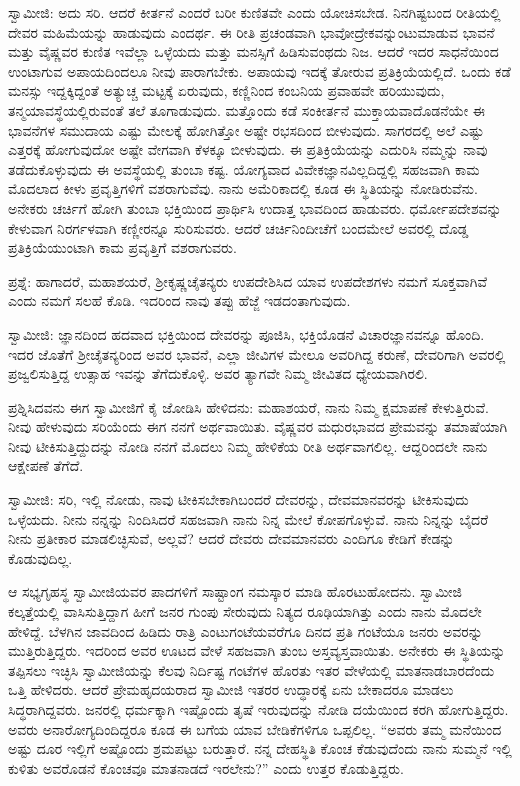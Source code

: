 ಸ್ವಾಮೀಜಿ: ಅದು ಸರಿ. ಆದರೆ ಕೀರ್ತನೆ ಎಂದರೆ ಬರೀ ಕುಣಿತವೇ ಎಂದು ಯೋಚಿಸಬೇಡ. ನಿನಗಿಷ್ಟಬಂದ ರೀತಿಯಲ್ಲಿ ದೇವರ ಮಹಿಮೆಯನ್ನು ಹಾಡುವುದು ಎಂದರ್ಥ. ಈ ರೀತಿ ಪ್ರಚಂಡವಾಗಿ ಭಾವೋದ್ರೇಕವನ್ನುಂಟುಮಾಡುವ ಭಾವನೆ ಮತ್ತು ವೈಷ್ಣವರ ಕುಣಿತ ಇವೆಲ್ಲಾ ಒಳ್ಳೆಯದು ಮತ್ತು ಮನಸ್ಸಿಗೆ ಹಿಡಿಸುವಂಥದು ನಿಜ. ಆದರೆ ಇದರ ಸಾಧನೆಯಿಂದ ಉಂಟಾಗುವ ಅಪಾಯದಿಂದಲೂ ನೀವು ಪಾರಾಗಬೇಕು. ಅಪಾಯವು ಇದಕ್ಕೆ ತೋರುವ ಪ್ರತಿಕ್ರಿಯೆಯಲ್ಲಿದೆ. ಒಂದು ಕಡೆ ಮನಸ್ಸು ಇದ್ದಕ್ಕಿದ್ದಂತೆ ಅತ್ಯುಚ್ಚ ಮಟ್ಟಕ್ಕೆ ಏರುವುದು, ಕಣ್ಣಿನಿಂದ ಕಂಬನಿಯ ಪ್ರವಾಹವೇ ಹರಿಯುವುದು, ತನ್ಮಯಾವಸ್ಥೆಯಲ್ಲಿರುವಂತೆ ತಲೆ ತೂಗಾಡುವುದು. ಮತ್ತೊಂದು ಕಡೆ ಸಂಕೀರ್ತನೆ ಮುಕ್ತಾಯವಾದೊಡನೆಯೇ ಈ ಭಾವನೆಗಳ ಸಮುದಾಯ ಎಷ್ಟು ಮೇಲಕ್ಕೆ ಹೋಗಿತ್ತೋ ಅಷ್ಟೇ ರಭಸದಿಂದ ಬೀಳುವುದು. ಸಾಗರದಲ್ಲಿ ಅಲೆ ಎಷ್ಟು ಎತ್ತರಕ್ಕೆ ಹೋಗುವುದೋ ಅಷ್ಟೇ ವೇಗವಾಗಿ ಕೆಳಕ್ಕೂ ಬೀಳುವುದು. ಈ ಪ್ರತಿಕ್ರಿಯೆಯನ್ನು ಎದುರಿಸಿ ನಮ್ಮನ್ನು ನಾವು ತಡೆದುಕೊಳ್ಳುವುದು ಈ ಅವಸ್ಥೆಯಲ್ಲಿ ತುಂಬಾ ಕಷ್ಟ. ಯೋಗ್ಯವಾದ ವಿವೇಕಜ್ಞಾನವಿಲ್ಲದಿದ್ದಲ್ಲಿ ಸಹಜವಾಗಿ ಕಾಮ ಮೊದಲಾದ ಕೀಳು ಪ್ರವೃತ್ತಿಗಳಿಗೆ ವಶರಾಗುವೆವು. ನಾನು ಅಮೆರಿಕಾದಲ್ಲಿ ಕೂಡ ಈ ಸ್ಥಿತಿಯನ್ನು ನೋಡಿರುವೆನು. ಅನೇಕರು ಚರ್ಚಿಗೆ ಹೋಗಿ ತುಂಬಾ ಭಕ್ತಿಯಿಂದ ಪ್ರಾರ್ಥಿಸಿ ಉದಾತ್ತ ಭಾವದಿಂದ ಹಾಡುವರು. ಧರ್ಮೋಪದೇಶವನ್ನು ಕೇಳುವಾಗ ನಿರರ್ಗಳವಾಗಿ ಕಣ್ಣೀರನ್ನೂ ಸುರಿಸುವರು. ಆದರೆ ಚರ್ಚಿನಿಂದೀಚೆಗೆ ಬಂದಮೇಲೆ ಅವರಲ್ಲಿ ದೊಡ್ಡ ಪ್ರತಿಕ್ರಿಯೆಯುಂಟಾಗಿ ಕಾಮ ಪ್ರವೃತ್ತಿಗೆ ವಶರಾಗುವರು.

ಪ್ರಶ್ನೆ: ಹಾಗಾದರೆ, ಮಹಾಶಯರೆ, ಶ‍್ರೀಕೃಷ್ಣಚೈತನ್ಯರು ಉಪದೇಶಿಸಿದ ಯಾವ ಉಪದೇಶಗಳು ನಮಗೆ ಸೂಕ್ತವಾಗಿವೆ ಎಂದು ನಮಗೆ ಸಲಹೆ ಕೊಡಿ. ಇದರಿಂದ ನಾವು ತಪ್ಪು ಹೆಜ್ಜೆ ಇಡದಂತಾಗುವುದು.

ಸ್ವಾಮೀಜಿ: ಜ್ಞಾನದಿಂದ ಹದವಾದ ಭಕ್ತಿಯಿಂದ ದೇವರನ್ನು ಪೂಜಿಸಿ, ಭಕ್ತಿಯೊಡನೆ ವಿಚಾರಜ್ಞಾನವನ್ನೂ ಹೊಂದಿ. ಇದರ ಜೊತೆಗೆ ಶ‍್ರೀಚೈತನ್ಯರಿಂದ ಅವರ ಭಾವನೆ, ಎಲ್ಲಾ ಜೀವಿಗಳ ಮೇಲೂ ಅವರಿಗಿದ್ದ ಕರುಣೆ, ದೇವರಿಗಾಗಿ ಅವರಲ್ಲಿ ಪ್ರಜ್ವಲಿಸುತ್ತಿದ್ದ ಉತ್ಸಾಹ ಇವನ್ನು ತೆಗೆದುಕೊಳ್ಳಿ. ಅವರ ತ್ಯಾಗವೇ ನಿಮ್ಮ ಜೀವಿತದ ಧ್ಯೇಯವಾಗಿರಲಿ.

ಪ್ರಶ್ನಿಸಿದವನು ಈಗ ಸ್ವಾಮೀಜಿಗೆ ಕೈ ಜೋಡಿಸಿ ಹೇಳಿದನು: ಮಹಾಶಯರೆ, ನಾನು ನಿಮ್ಮ ಕ್ಷಮಾಪಣೆ ಕೇಳುತ್ತಿರುವೆ. ನೀವು ಹೇಳುವುದು ಸರಿಯೆಂದು ಈಗ ನನಗೆ ಅರ್ಥವಾಯಿತು. ವೈಷ್ಣವರ ಮಧುರಭಾವದ ಪ್ರೇಮವನ್ನು ತಮಾಷೆಯಾಗಿ ನೀವು ಟೀಕಿಸುತ್ತಿದ್ದುದನ್ನು ನೋಡಿ ನನಗೆ ಮೊದಲು ನಿಮ್ಮ ಹೇಳಿಕೆಯ ರೀತಿ ಅರ್ಥವಾಗಲಿಲ್ಲ. ಆದ್ದರಿಂದಲೇ ನಾನು ಆಕ್ಷೇಪಣೆ ತೆಗೆದೆ.

ಸ್ವಾಮೀಜಿ: ಸರಿ, ಇಲ್ಲಿ ನೋಡು, ನಾವು ಟೀಕಿಸಬೇಕಾಗಿಬಂದರೆ ದೇವರನ್ನು, ದೇವಮಾನವರನ್ನು ಟೀಕಿಸುವುದು ಒಳ್ಳೆಯದು. ನೀನು ನನ್ನನ್ನು ನಿಂದಿಸಿದರೆ ಸಹಜವಾಗಿ ನಾನು ನಿನ್ನ ಮೇಲೆ ಕೋಪಗೊಳ್ಳುವೆ. ನಾನು ನಿನ್ನನ್ನು ಬೈದರೆ ನೀನು ಪ್ರತೀಕಾರ ಮಾಡಲಿಚ್ಛಿಸುವೆ, ಅಲ್ಲವೆ? ಆದರೆ ದೇವರು ದೇವಮಾನವರು ಎಂದಿಗೂ ಕೇಡಿಗೆ ಕೇಡನ್ನು ಕೊಡುವುದಿಲ್ಲ.

ಆ ಸಭ್ಯಗೃಹಸ್ಥ ಸ್ವಾಮೀಜಿಯವರ ಪಾದಗಳಿಗೆ ಸಾಷ್ಟಾಂಗ ನಮಸ್ಕಾರ ಮಾಡಿ ಹೊರಟುಹೋದನು. ಸ್ವಾಮೀಜಿ ಕಲ್ಕತ್ತೆಯಲ್ಲಿ ವಾಸಿಸುತ್ತಿದ್ದಾಗ ಹೀಗೆ ಜನರ ಗುಂಪು ಸೇರುವುದು ನಿತ್ಯದ ರೂಢಿಯಾಗಿತ್ತು ಎಂದು ನಾನು ಮೊದಲೇ ಹೇಳಿದ್ದೆ. ಬೆಳಗಿನ ಜಾವದಿಂದ ಹಿಡಿದು ರಾತ್ರಿ ಎಂಟುಗಂಟೆಯವರೆಗೂ ದಿನದ ಪ್ರತಿ ಗಂಟೆಯೂ ಜನರು ಅವರನ್ನು ಮುತ್ತಿರುತ್ತಿದ್ದರು. ಇದರಿಂದ ಅವರ ಊಟದ ವೇಳೆ ಸಹಜವಾಗಿ ತುಂಬ ಅಸ್ತವ್ಯಸ್ತವಾಯಿತು. ಅನೇಕರು ಈ ಸ್ಥಿತಿಯನ್ನು ತಪ್ಪಿಸಲು ಇಚ್ಛಿಸಿ ಸ್ವಾಮೀಜಿಯನ್ನು ಕೆಲವು ನಿರ್ದಿಷ್ಟ ಗಂಟೆಗಳ ಹೊರತು ಇತರ ವೇಳೆಯಲ್ಲಿ ಮಾತನಾಡಬಾರದೆಂದು ಒತ್ತಿ ಹೇಳಿದರು. ಆದರೆ ಪ್ರೇಮಹೃದಯರಾದ ಸ್ವಾಮೀಜಿ ಇತರರ ಉದ್ಧಾರಕ್ಕೆ ಏನು ಬೇಕಾದರೂ ಮಾಡಲು ಸಿದ್ಧರಾಗಿದ್ದವರು. ಜನರಲ್ಲಿ ಧರ್ಮಕ್ಕಾಗಿ ಇಷ್ಟೊಂದು ತೃಷೆ ಇರುವುದನ್ನು ನೋಡಿ ದಯೆಯಿಂದ ಕರಗಿ ಹೋಗುತ್ತಿದ್ದರು. ಅವರು ಅನಾರೋಗ್ಯದಿಂದಿದ್ದರೂ ಕೂಡ ಈ ಬಗೆಯ ಯಾವ ಬೇಡಿಕೆಗಳಿಗೂ ಒಪ್ಪಲಿಲ್ಲ. “ಅವರು ತಮ್ಮ ಮನೆಯಿಂದ ಅಷ್ಟು ದೂರ ಇಲ್ಲಿಗೆ ಅಷ್ಟೊಂದು ಶ್ರಮಪಟ್ಟು ಬರುತ್ತಾರೆ. ನನ್ನ ದೇಹಸ್ಥಿತಿ ಕೊಂಚ ಕೆಡುವುದೆಂದು ನಾನು ಸುಮ್ಮನೆ ಇಲ್ಲಿ ಕುಳಿತು ಅವರೊಡನೆ ಕೊಂಚವೂ ಮಾತನಾಡದೆ ಇರಲೇನು?” ಎಂದು ಉತ್ತರ ಕೊಡುತ್ತಿದ್ದರು.


